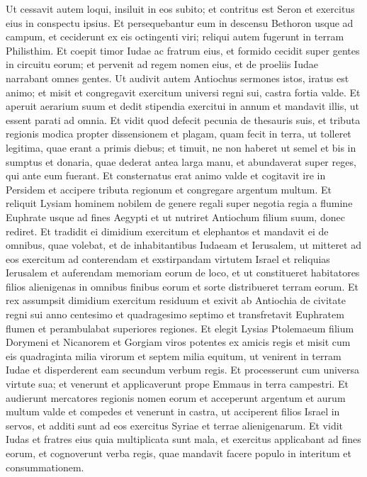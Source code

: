 \begin{biblechapter}
\begin{biblechapter}
\begin{biblechapter}
\verse Ut cessavit autem loqui, insiluit in eos subito; et contritus est Seron et exercitus eius in conspectu ipsius. 
\verse Et persequebantur eum in descensu Bethoron usque ad campum, et ceciderunt ex eis octingenti viri; reliqui autem fugerunt in terram Philisthim. 
\verse Et coepit timor Iudae ac fratrum eius, et formido cecidit super gentes in circuitu eorum; 
\verse et pervenit ad regem nomen eius, et de proeliis Iudae narrabant omnes gentes.
 \verse Ut audivit autem Antiochus sermones istos, iratus est animo; et misit et congregavit exercitum universi regni sui, castra fortia valde. 
\verse Et aperuit aerarium suum et dedit stipendia exercitui in annum et mandavit illis, ut essent parati ad omnia. 
\verse Et vidit quod defecit pecunia de thesauris suis, et tributa regionis modica propter dissensionem et plagam, quam fecit in terra, ut tolleret legitima, quae erant a primis diebus; 
\verse et timuit, ne non haberet ut semel et bis in sumptus et donaria, quae dederat antea larga manu, et abundaverat super reges, qui ante eum fuerant. 
\verse Et consternatus erat animo valde et cogitavit ire in Persidem et accipere tributa regionum et congregare argentum multum. 
\verse Et reliquit Lysiam hominem nobilem de genere regali super negotia regia a flumine Euphrate usque ad fines Aegypti 
\verse et ut nutriret Antiochum filium suum, donec rediret. 
\verse Et tradidit ei dimidium exercitum et elephantos et mandavit ei de omnibus, quae volebat, et de inhabitantibus Iudaeam et Ierusalem, 
\verse ut mitteret ad eos exercitum ad conterendam et exstirpandam virtutem Israel et reliquias Ierusalem et auferendam memoriam eorum de loco, 
\verse et ut constitueret habitatores filios alienigenas in omnibus finibus eorum et sorte distribueret terram eorum. 
\verse Et rex assumpsit dimidium exercitum residuum et exivit ab Antiochia de civitate regni sui anno centesimo et quadragesimo septimo et transfretavit Euphratem flumen et perambulabat superiores regiones. 
\verse Et elegit Lysias Ptolemaeum filium Dorymeni et Nicanorem et Gorgiam viros potentes ex amicis regis 
\verse et misit cum eis quadraginta milia virorum et septem milia equitum, ut venirent in terram Iudae et disperderent eam secundum verbum regis. 
\verse Et processerunt cum universa virtute sua; et venerunt et applicaverunt prope Emmaus in terra campestri. 
\verse Et audierunt mercatores regionis nomen eorum et acceperunt argentum et aurum multum valde et compedes et venerunt in castra, ut acciperent filios Israel in servos, et additi sunt ad eos exercitus Syriae et terrae alienigenarum.
 \verse Et vidit Iudas et fratres eius quia multiplicata sunt mala, et exercitus applicabant ad fines eorum, et cognoverunt verba regis, quae mandavit facere populo in interitum et consummationem. 

\end{biblechapter}
\end{biblechapter}
\end{biblechapter}
